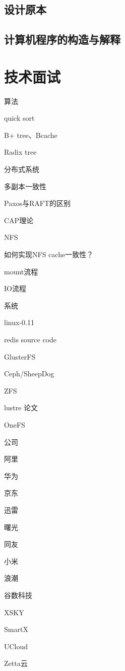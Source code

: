 \subsection{设计原本}

\subsection{计算机程序的构造与解释}

\section{技术面试}

算法
\begin{enumbox}
\item quick sort
\item B+ tree、Bcache
\item Radix tree
\end{enumbox}

分布式系统
\begin{enumbox}
\item 多副本一致性
\item Paxos与RAFT的区别
\item CAP理论
\end{enumbox}

NFS
\begin{enumbox}
\item 如何实现NFS cache一致性？
\item mount流程
\item IO流程
\end{enumbox}

系统
\begin{enumbox}
\item linux-0.11
\item redis source code
\item GlusterFS
\item Ceph/SheepDog
\item ZFS
\item lustre 论文
\item OneFS
\end{enumbox}

公司
\begin{enumbox}
\item 阿里
\item 华为
\item 京东
\item 迅雷
\item 曙光
\item 同友
\item 小米
\item 浪潮
\item 谷数科技
\item XSKY
\item SmartX
\item UCloud
\item Zetta云
\end{enumbox}
